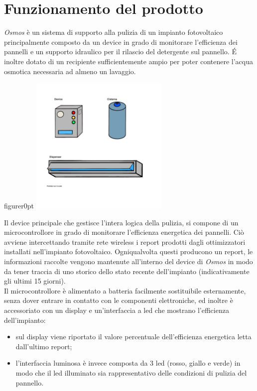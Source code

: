 \documentclass[a4paper, 12pt]{article}
\begin{document}
	\section{Funzionamento del prodotto}
	\emph{Osmos} è un sistema di supporto alla pulizia di un impianto fotovoltaico principalmente composto da un device in grado di monitorare l'efficienza dei pannelli 
	e un supporto idraulico per il rilascio del detergente sul pannello. \'E inoltre dotato di un recipiente sufficientemente ampio per poter contenere l'acqua osmotica necessaria ad almeno un lavaggio.\\
	\begin{wrapfloat}{figure}{r}{0pt}
		\includegraphics[width=0.5\textwidth]{Images/PROTOTIPO3.JPG}
	\end{wrapfloat}
	Il device principale che gestisce l'intera logica della pulizia, si compone di un microcontrollore in grado di monitorare l'efficienza energetica dei pannelli. Ciò avviene intercettando tramite rete wireless i report prodotti dagli ottimizzatori installati nell'impianto fotovoltaico. Ogniqualvolta questi producono un report, le informazioni raccolte vengono mantenute all'interno del device di \emph{Osmos} in modo da tener traccia di uno storico dello stato recente dell'impianto (indicativamente gli ultimi 15 giorni).\\
	Il microcontrollore è alimentato a batteria facilmente sostituibile esternamente, senza dover entrare in contatto con le componenti elettroniche, ed inoltre è accessoriato con un display e un'interfaccia a led che mostrano l'efficienza dell'impianto:
	\begin{itemize}
		\item sul display viene riportato il valore percentuale dell'efficienza energetica letta dall'ultimo report;
		\item l'interfaccia luminosa è invece composta da 3 led (rosso, giallo e verde) in modo che il led illuminato sia rappresentativo delle condizioni di pulizia del pannello.
	\end{itemize}
\end{document}
